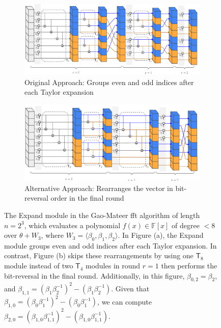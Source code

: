 \begin{figure}
	\centering
	\begin{subfigure}[b]{0.9\linewidth} %
		\centering
		\includegraphics[width=0.9\linewidth]{Figures/Gao_expand.pdf} 
		\caption{ Original Approach: Groups even and odd indices after each Taylor expansion}
		\label{fig:gao-expand-old}
	\end{subfigure}
	\vspace{1em} %
	\begin{subfigure}[b]{0.9\linewidth} %
		\centering
		\includegraphics[width=0.9\linewidth]{Figures/Gao_expand_binary.pdf} 
		\caption{ Alternative Approach: Rearranges the vector in bit-reversal order in the final round}
		\label{fig:gao-expand-binary}
	\end{subfigure}
	
	\caption[The \textsf{Expand} module in the Gao-Mateer FFT algorithm]{The \textsf{Expand} module in the Gao-Mateer \gls{fft} algorithm of length $n=2^3$, which evaluates a polynomial $f(x) \in \mathbb{F}[x]$ of degree $< 8$ over $\theta + W_3$, where $W_3 = \langle \beta_0, \beta_1, \beta_2 \rangle$. 
		In Figure (a), the \textsf{Expand} module groups even and odd indices after each Taylor expansion. In contrast, Figure (b) skips these rearrangements by using one $\textsf{T}_8$ module instead of two $\textsf{T}_4$ modules in round $r=1$ then performs the bit-reversal in the final round. 
		 Additionally, in this figure, $\beta_{0,2} = \beta_2$, and $\beta_{1,1} = (\beta_1 \beta_2^{-1})^2 -  (\beta_1 \beta_2^{-1})$. Given that $\beta_{1,0} = (\beta_0 \beta_1^{-1})^2 -  (\beta_0 \beta_1^{-1})$, we can compute $\beta_{2,0} = (\beta_{1,0} \beta_{1,1}^{-1})^2 -  (\beta_{1,0} \beta_{1,1}^{-1})$.
	}
	
	\label{fig:gao-expand}
\end{figure}

